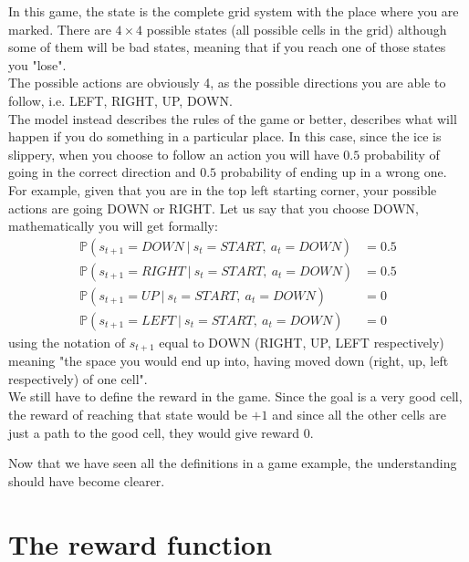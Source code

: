 In this game, the state is the complete grid system with the place where you are marked. There are $4 \times 4$ possible states (all possible cells in the grid) although some of them will be bad states, meaning that if you reach one of those states you "lose". \\
The possible actions are obviously 4, as the possible directions you are able to follow, i.e. LEFT, RIGHT, UP, DOWN. \\
The model instead describes the rules of the game or better, describes what will happen if you do something in a particular place. In this case, since the ice is slippery, when you choose to follow an action you will have $0.5$ probability of going in the correct direction and $0.5$ probability of ending up in a wrong one. \\
For example, given that you are in the top left starting corner, your possible actions are going DOWN or RIGHT. Let us say that you choose DOWN, mathematically you will get formally:
\begin{align*}
    \mathbb{P}(s_{t+1} = DOWN \ \vert \ s_t = START, \ a_t = DOWN) &= 0.5 \\
    \mathbb{P}(s_{t+1} = RIGHT \ \vert \ s_t = START, \ a_t = DOWN) &= 0.5 \\
    \mathbb{P}(s_{t+1} = UP \ \vert \ s_t = START, \ a_t = DOWN) &= 0 \\
    \mathbb{P}(s_{t+1} = LEFT \ \vert \ s_t = START, \ a_t = DOWN) &= 0
\end{align*}
using the notation of $s_{t+1}$ equal to DOWN (RIGHT, UP, LEFT respectively) meaning "the space you would end up into, having moved down (right, up, left respectively) of one cell". \\
We still have to define the reward in the game. Since the goal is a very good cell, the reward of reaching that state would be $+1$ and since all the other cells are just a path to the good cell, they would give reward $0$.

Now that we have seen all the definitions in a game example, the understanding should have become clearer.

\section{The reward function}

